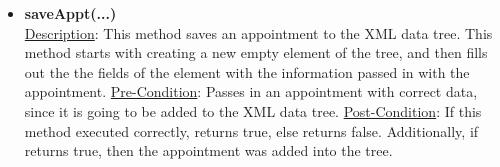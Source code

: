 \documentclass[12pt]{article}
\begin{document}
\begin{itemize}
\begin{itemize}
	\item \textbf{saveAppt(...)} \\
	\underline{Description}: This method saves an appointment to the XML data tree. This method starts with creating a new empty element of the tree, and then fills out the the fields of the element with the information passed in with the appointment. \newline
	\underline{Pre-Condition}: Passes in an appointment with correct data, since it is going to be added to the XML data tree.  \newline 
	\underline{Post-Condition}: If this method executed correctly, returns true, else returns false. Additionally, if returns true, then the appointment was added into the tree.
	\end{itemize}
\end{itemize}
\end{document}

